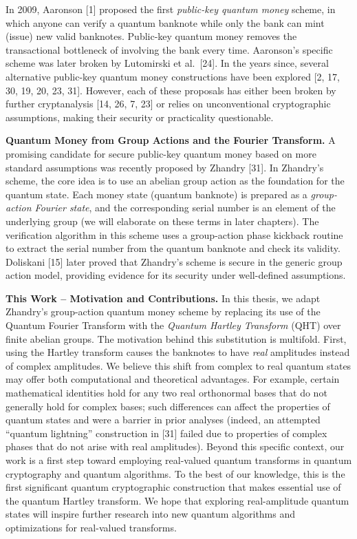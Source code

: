 \documentclass[12pt]{report}
\begin{document}
In 2009, Aaronson [1] proposed the first \emph{public-key quantum money} scheme, in which anyone can verify a quantum banknote while only the bank can mint (issue) new valid banknotes. Public-key quantum money removes the transactional bottleneck of involving the bank every time. Aaronson’s specific scheme was later broken by Lutomirski et al.~[24]. In the years since, several alternative public-key quantum money constructions have been explored [2, 17, 30, 19, 20, 23, 31]. However, each of these proposals has either been broken by further cryptanalysis [14, 26, 7, 23] or relies on unconventional cryptographic assumptions, making their security or practicality questionable.

\medskip\noindent\textbf{Quantum Money from Group Actions and the Fourier Transform.} 
A promising candidate for secure public-key quantum money based on more standard assumptions was recently proposed by Zhandry [31]. In Zhandry’s scheme, the core idea is to use an abelian group action as the foundation for the quantum state. Each money state (quantum banknote) is prepared as a \emph{group-action Fourier state}, and the corresponding serial number is an element of the underlying group (we will elaborate on these terms in later chapters). The verification algorithm in this scheme uses a group-action phase kickback routine to extract the serial number from the quantum banknote and check its validity. Doliskani [15] later proved that Zhandry’s scheme is secure in the generic group action model, providing evidence for its security under well-defined assumptions.

\medskip\noindent\textbf{This Work – Motivation and Contributions.} 
In this thesis, we adapt Zhandry’s group-action quantum money scheme by replacing its use of the Quantum Fourier Transform with the \emph{Quantum Hartley Transform} (QHT) over finite abelian groups. The motivation behind this substitution is multifold. First, using the Hartley transform causes the banknotes to have \emph{real} amplitudes instead of complex amplitudes. We believe this shift from complex to real quantum states may offer both computational and theoretical advantages. For example, certain mathematical identities hold for any two real orthonormal bases that do not generally hold for complex bases; such differences can affect the properties of quantum states and were a barrier in prior analyses (indeed, an attempted “quantum lightning” construction in [31] failed due to properties of complex phases that do not arise with real amplitudes). Beyond this specific context, our work is a first step toward employing real-valued quantum transforms in quantum cryptography and quantum algorithms. To the best of our knowledge, this is the first significant quantum cryptographic construction that makes essential use of the quantum Hartley transform. We hope that exploring real-amplitude quantum states will inspire further research into new quantum algorithms and optimizations for real-valued transforms.
\end{document}
